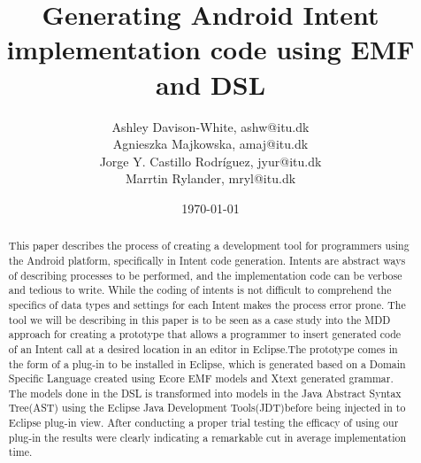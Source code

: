 \documentclass{llncs}
\title{Generating Android Intent implementation code using EMF and DSL}
\author{Ashley Davison-White, ashw@itu.dk 
      \\Agnieszka Majkowska, amaj@itu.dk
      \\Jorge Y. Castillo Rodríguez, jyur@itu.dk
      \\Marrtin Rylander, mryl@itu.dk}
\institute{IT University of Copenhagen}
\date{\today}
\begin{document}
\maketitle

 \begin{abstract}
 This paper describes the process of creating a development tool for programmers using the Android platform, specifically in Intent code generation.
Intents are abstract ways of describing processes to be performed, and the implementation code can be verbose and tedious to write. While the coding of intents is not difficult to comprehend the specifics of data types and settings for each Intent makes the process error prone. The tool we will be describing in this paper is to be seen as a case study into the MDD approach for creating a prototype that allows a programmer to insert generated code of an Intent call at a desired location in an editor in Eclipse.The prototype comes in the form of a plug-in to be installed in Eclipse, which is generated based on a Domain Specific Language created using Ecore EMF models and Xtext generated grammar.
 The models done in the DSL is transformed into models in the Java Abstract Syntax Tree(AST) using the Eclipse Java Development Tools(JDT)before being injected in to Eclipse plug-in view.
 After conducting a proper trial testing the efficacy of using our plug-in the results were clearly indicating a remarkable cut in average implementation time.    
 \end{abstract}






















\setlength{\bibsep}{0.0pt}


\end{document}
